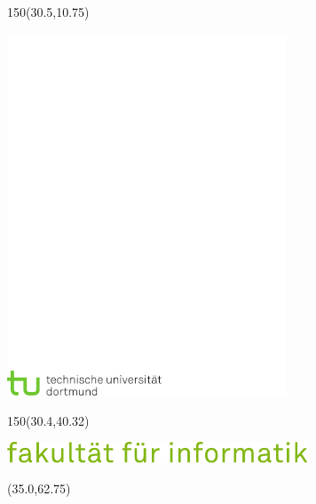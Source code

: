 
\begin{titlepage}

\begin{textblock}{150}(30.5,10.75)%
\raggedright
\includegraphics[width=83.25mm]{bilder/tud_logo_cmyk.pdf}%
\end{textblock}


\begin{textblock}{150}(30.4,40.32)%
\raggedright
\includegraphics[width=90mm]{bilder/fi_text.pdf}
\end{textblock}

\begin{textblock}{89}(35.0,62.75)%
\begin{minipage}{80mm}
	\vfill
	\begin{center}
	\fontsize{24pt}{24pt} \textsf
	\Arbeitsbezeichnung
	
	\vspace{1cm}
	\begin{onehalfspace}
    \fontsize{18pt}{18pt}
    \textsf \Arbeitstitel
    \end{onehalfspace}
	

\end{center}
\end{minipage}
\end{textblock}
\end{titlepage}
